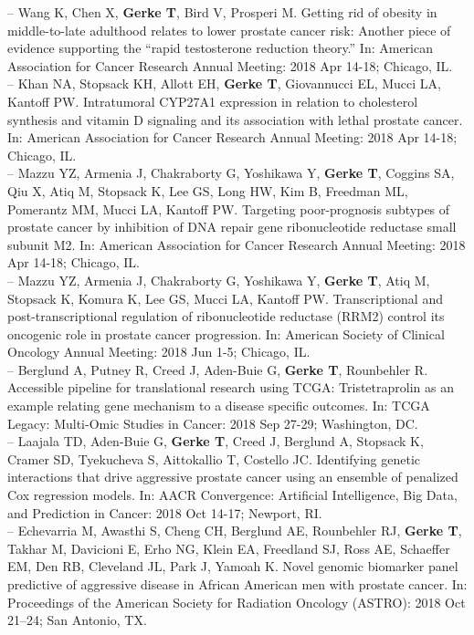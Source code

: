 \documentclass[11pt, a4paper]{article} %
\begin{document}
-- Wang K, Chen X, {\bf Gerke T}, Bird V, Prosperi M.  Getting rid of obesity in middle-to-late adulthood relates to lower prostate cancer risk: Another piece of evidence supporting the ``rapid testosterone reduction theory.'' In: American Association for Cancer Research Annual Meeting: 2018 Apr 14-18; Chicago, IL.\\

-- Khan NA, Stopsack KH, Allott EH, {\bf Gerke T}, Giovannucci EL, Mucci LA, Kantoff PW. Intratumoral CYP27A1 expression in relation to cholesterol synthesis and vitamin D signaling and its association with lethal prostate cancer. In: American Association for Cancer Research Annual Meeting: 2018 Apr 14-18; Chicago, IL.\\

-- Mazzu YZ, Armenia J, Chakraborty G, Yoshikawa Y, {\bf Gerke T}, Coggins SA, Qiu X, Atiq M, Stopsack K, Lee GS, Long HW, Kim B, Freedman ML, Pomerantz MM, Mucci LA, Kantoff PW. Targeting poor-prognosis subtypes of prostate cancer by inhibition of DNA repair gene ribonucleotide reductase small subunit M2. In: American Association for Cancer Research Annual Meeting: 2018 Apr 14-18; Chicago, IL.\\

-- Mazzu YZ, Armenia J, Chakraborty G, Yoshikawa Y, {\bf Gerke T}, Atiq M, Stopsack K, Komura K, Lee GS, Mucci LA, Kantoff PW. Transcriptional and post-transcriptional regulation of ribonucleotide reductase (RRM2) control its oncogenic role in prostate cancer progression. In: American Society of Clinical Oncology Annual Meeting: 2018 Jun 1-5; Chicago, IL.\\

-- Berglund A, Putney R, Creed J, Aden-Buie G, {\bf Gerke T}, Rounbehler R. Accessible pipeline for translational research using TCGA: Tristetraprolin as an example relating gene mechanism to a disease specific outcomes. In: TCGA Legacy: Multi-Omic Studies in Cancer: 2018 Sep 27-29; Washington, DC.\\

-- Laajala TD, Aden-Buie G, {\bf Gerke T}, Creed J, Berglund A, Stopsack K, Cramer SD, Tyekucheva S, Aittokallio T, Costello JC. Identifying genetic interactions that drive aggressive prostate cancer using an ensemble of penalized Cox regression models.  In: AACR Convergence: Artificial Intelligence, Big Data, and Prediction in Cancer: 2018 Oct 14-17; Newport, RI.\\

-- Echevarria M, Awasthi S, Cheng CH, Berglund AE, Rounbehler RJ, {\bf Gerke T}, Takhar M, Davicioni E, Erho NG, Klein EA, Freedland SJ, Ross AE, Schaeffer EM, Den RB, Cleveland JL, Park J, Yamoah K. Novel genomic biomarker panel predictive of aggressive disease in African American men with prostate cancer. In: Proceedings of the American Society for Radiation Oncology (ASTRO): 2018 Oct 21--24; San Antonio, TX.\\
\end{document}

